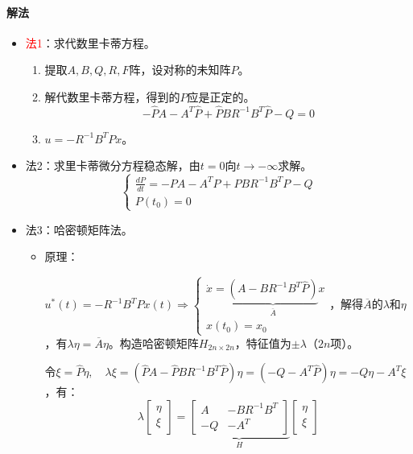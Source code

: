 \documentclass[
12pt, %
a4paper, 
oneside, %
]{scrartcl}
\begin{document}
\paragraph{解法}
\begin{itemize}
\item \textcolor{red}{法1}：求代数里卡蒂方程。
\begin{enumerate}
\item 提取$ A, B, Q, R, F $阵，设对称的未知阵$ P $。
\item 解代数里卡蒂方程，得到的$ P $应是正定的。
$$ -\hat{P} A - A^T \hat{P} + \hat{P} B R^{-1} B^T \hat{P} - Q = 0 $$
\item $ u = -R^{-1} B^T P x $。
\end{enumerate}
\item 法2：求里卡蒂微分方程稳态解，由$ t = 0 $向$ t \to -\infty $求解。
$$ \begin{cases} \frac{d P}{d t} = -P A - A^T P + P B R^{-1} B^T P - Q \\ P(t_0) = 0 \end{cases} $$
\item 法3：哈密顿矩阵法。
\begin{itemize}
\item 原理：

$ u^*(t) = - R^{-1} B^T \hat{P} x(t) \Rightarrow \begin{cases} \dot{x} = \underbrace{(A - B R^{-1} B^T \hat{P})}_{\overline{A}} x \\ x(t_0) = x_0 \end{cases} $，解得$ \overline{A} $的$ \lambda $和$ \eta $，有$ \lambda \eta = \overline{A} \eta $。构造哈密顿矩阵$ H_{2n \times 2n} $，特征值为$ \pm \lambda $（$ 2n $项）。

令$ \xi = \hat{P} \eta, \quad \lambda \xi = (\hat{P} A - \hat{P} B R^{-1} B^T \hat{P}) \eta = (-Q - A^T \hat{P}) \eta = -Q \eta - A^T \xi $，有：
$$ \lambda \begin{bmatrix} \eta \\ \xi \end{bmatrix} = \underbrace{\begin{bmatrix} A & -B R^{-1} B^T \\ -Q & -A^T \end{bmatrix}}_{H} \begin{bmatrix} \eta \\ \xi \end{bmatrix} $$


\end{itemize}
\end{itemize}
\end{document}
